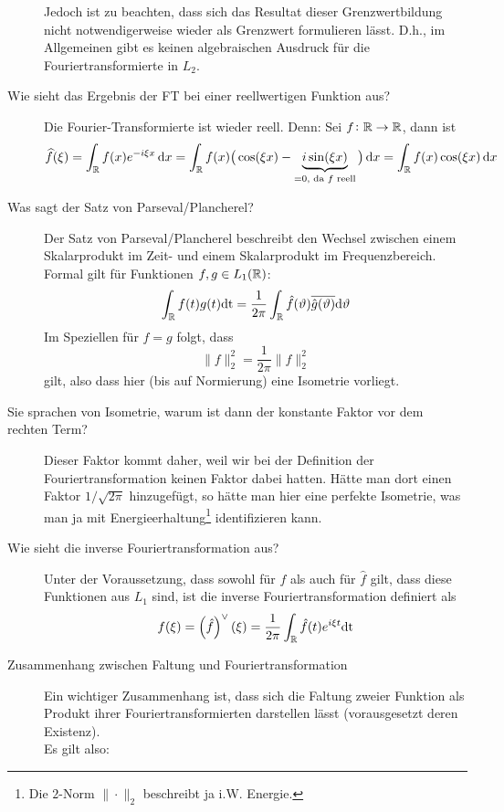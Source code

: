 \begin{description}
      Jedoch ist zu beachten, dass sich das Resultat dieser Grenzwertbildung nicht notwendigerweise
      wieder als Grenzwert formulieren lässt. D.h., im Allgemeinen gibt es keinen algebraischen 
      Ausdruck für die Fouriertransformierte in $L_2$.
	\item[Wie sieht das Ergebnis der FT bei einer reellwertigen Funktion aus?]
  	Die Fourier-Transformierte ist wieder reell. Denn: Sei $ f \colon \mathbb{R} \rightarrow \mathbb{R} $, dann ist
    \[
    	 \widehat{f}(\xi)
  	= \int_{\R} f(x) e^{-i\xi x} \dif x \\
  	= \int_{\R} f(x) \big(
          \cos(\xi x) - \underbrace{i \sin(\xi x)}_{= 0, \text{ da $ f $ reell}}
       \big)  \dif x \\
    = \int_{\R} f(x) \cos(\xi x) \dif x
    \]
  \item[Was sagt der Satz von Parseval/Plancherel?]
    Der Satz von Parseval/Plancherel beschreibt den Wechsel zwischen einem 
    Skalarprodukt im Zeit- und einem Skalarprodukt im Frequenzbereich.\\
    Formal gilt für Funktionen $f, g \in L_1(\mathbb{R})$:
    $$ \int_{\mathbb{R}} f(t)g(t)\text{dt} = \frac{1}{2\pi}\int_{\mathbb{R}}\hat f(\vartheta)\overline{\hat 
    g(\vartheta)}\text{d} \vartheta $$
    Im Speziellen für $f=g$ folgt, dass
    $$ \|f\|_2^2 = \frac{1}{2\pi}\|\hat f\|_2^2 $$
    gilt, also dass hier (bis auf Normierung) eine Isometrie vorliegt.
  \item[Sie sprachen von Isometrie, warum ist dann der konstante Faktor vor dem rechten Term?]
    Dieser Faktor kommt daher, weil wir bei der Definition der Fouriertransformation keinen Faktor
    dabei hatten. Hätte man dort einen Faktor $1/\sqrt{2\pi}$ hinzugefügt, so hätte man hier eine
    perfekte Isometrie, was man ja mit Energieerhaltung\footnote{Die $2$-Norm $\|\cdot\|_2$ 
    beschreibt ja i.W. Energie.} identifizieren kann.
\item[Wie sieht die inverse Fouriertransformation aus?]
    Unter der Voraussetzung, dass sowohl für $f$ als auch für $\hat f$ gilt, dass
    diese Funktionen aus $L_1$ sind, ist die inverse Fouriertransformation 
    definiert als
    $$ f(\xi) = \left(\hat f\right)^{\lor{}}(\xi) = \frac{1}{2\pi}\int_{\mathbb{R}} \hat f(t)e^{i\xi 
    t}\text{dt} $$      
\item[Zusammenhang zwischen Faltung und Fouriertransformation]
    Ein wichtiger Zusammenhang ist, dass sich die Faltung zweier Funktion als Produkt ihrer 
    Fouriertransformierten darstellen lässt (vorausgesetzt deren Existenz).\\
    Es gilt also:
    

\end{description}
